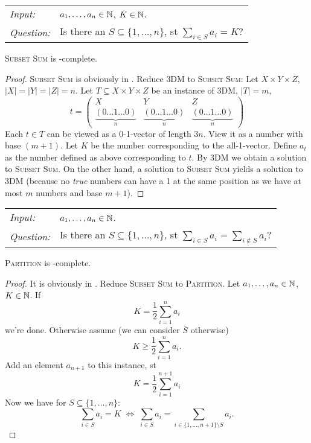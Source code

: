 \documentclass[../skript.tex]{subfiles}
\begin{document}
\begin{problem}
\begin{tabular}{ll}
\textit{Input:} & $a_1, \ldots, a_n \in \mathbb{N}$, $K \in \mathbb{N}$. \\
\textit{Question:} & Is there an $S \subseteq \{ 1, \ldots, n \}$, \ac{st} $\sum_{i \in S} a_i = K$?
\end{tabular}
\end{problem}
\begin{theorem} %
\label{thm:14}
\textsc{Subset Sum} is \NP-complete.
\end{theorem}
\begin{proof}
\textsc{Subset Sum} is obviously in \NP.
Reduce \textsc{3DM} to \textsc{Subset Sum}: Let $X \times Y \times Z$, $|X| = |Y| = |Z| = n$.
Let $T \subseteq X \times Y \times Z$ be an instance of \textsc{3DM}, $|T| = m$,
\[
	t = \begin{pmatrix}
	X & Y & Z \\
	\underbrace{(0 \ldots 1 \ldots 0)}_{n} & \underbrace{(0 \ldots 1 \ldots 0)}_{n} & \underbrace{(0 \ldots 1 \ldots 0)}_{n}
	\end{pmatrix}
\]
Each $t \in T$ can be viewed as a 0-1-vector of length $3n$.
View it as a number with base $(m + 1)$.
Let $K$ be the number corresponding to the all-1-vector. Define $a_t$ as the number defined as above corresponding to $t$.
By \textsc{3DM} we obtain a solution to \textsc{Subset Sum}.
On the other hand, a solution to \textsc{Subset Sum} yields a solution to \textsc{3DM} (because no \textit{true} numbers can have a 1 at the same position as we have at most $m$ numbers and base $m + 1$).
\end{proof}
\begin{problem}[Partition]
\begin{tabular}{ll}
\textit{Input:} & $a_1, \ldots, a_n \in \mathbb{N}$. \\
\textit{Question:} & Is there an $S \subseteq \{ 1, \ldots, n \}$, \ac{st} $\sum_{i \in S} a_i = \sum_{i \notin S} a_i$?
\end{tabular}
\end{problem}
\begin{theorem} %
\label{thm:15}
\textsc{Partition} is \NP-complete.
\end{theorem}
\begin{proof}
It is obviously in \NP.
Reduce \textsc{Subset Sum} to \textsc{Partition}. Let $a_1, \ldots, a_n \in \mathbb{N}$, $K \in \mathbb{N}$.
If
\[
	K = \frac{1}{2} \sum_{i = 1}^n a_i
\]
we're done.
Otherwise assume (we can consider $\bar{S}$ otherwise)
\[
	K \geq \frac{1}{2} \sum_{i = 1}^n a_i.
\]
Add an element $a_{n+1}$ to this instance, \ac{st}
\[
	K = \frac{1}{2} \sum_{i = 1}^{n+1} a_i
\]
Now we have for $S \subseteq \{ 1, \ldots, n \}$:
\[
	\sum_{i \in S} a_i = K \; \Leftrightarrow \; \sum_{i \in S} a_i = \sum_{i \in \{ 1, \ldots, n + 1 \} \setminus S} a_i.
\]
\end{proof}
\end{document}
